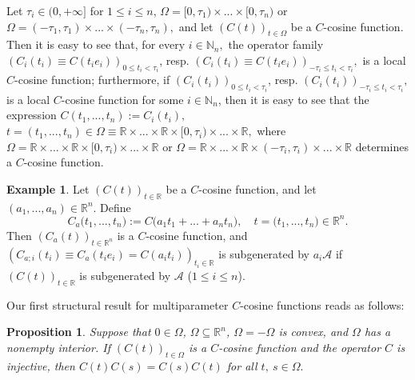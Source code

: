 \documentclass{amsart}
\newtheorem{prop}[thm]{Proposition}
\theoremstyle{definition}
\newtheorem{example}[thm]{Example}
\theoremstyle{remark}
\numberwithin{equation}{section}
\begin{document}
Let $\tau_{i}\in (0,+\infty]$ for $1\leq i \leq n$, $\Omega =[0,\tau_{1}) \times ... \times [0,\tau_{n})$ or $\Omega =(-\tau_{1},\tau_{1}) \times ... \times (-\tau_{n},\tau_{n}),$ and let $(C(t))_{t\in \Omega}$ 
be a $C$-cosine function. Then it is easy to see that, for every $i\in {\mathbb N}_{n},$ the operator family $(C_{i}(t_{i})\equiv C(t_{i}e_{i}))_{0\leq t_{i} <\tau_{i}}$, resp. $(C_{i}(t_{i})\equiv C(t_{i}e_{i}))_{-\tau_{i}\leq t_{i} <\tau_{i}},$  is a local $C$-cosine function; furthermore, if 
$(C_{i}(t_{i}))_{0\leq t_{i} <\tau_{i}}$, resp. $(C_{i}(t_{i}))_{-\tau_{i}\leq t_{i} <\tau_{i}},$ is a local $C$-cosine function for some $i\in {\mathbb N}_{n}$, then it is easy to see that the expression 
$C(t_{1},...,t_{n}):=C_{i}(t_{i}),$ $t=(t_{1},...,t_{n})\in \Omega\equiv {\mathbb R} \times ...\times {\mathbb R} \times [0,\tau_{i}) \times ... \times {\mathbb R},$ where $\Omega = {\mathbb R} \times ...\times {\mathbb R} \times [0,\tau_{i}) \times ... \times {\mathbb R}$ or $\Omega ={\mathbb R} \times ...\times {\mathbb R} \times (-\tau_{i},\tau_{i}) \times ... \times {\mathbb R}$ determines a $C$-cosine function. 

\begin{example}\label{pas}
Let $(C(t))_{t\in {\mathbb R}}$ be a $C$-cosine function, and let $(a_{1},...,a_{n})\in {\mathbb R}^{n}.$ Define
$$
C_{a}\bigl(t_{1},...,t_{n}\bigr):=C\bigl( a_{1}t_{1}+...+a_{n}t_{n}\bigr),\quad t=\bigl(t_{1},...,t_{n}\bigr) \in {\mathbb R}^{n}.
$$
Then $(C_{a}(t))_{t\in {\mathbb R}^{n}}$ is a $C$-cosine function, and $(C_{a;i}(t_{i})\equiv C_{a}(t_{i}e_{i})=C(a_{i}t_{i}))_{t_{i} \in {\mathbb R}}$ is subgenerated by $a_{i}{\mathcal A}$ if $(C(t))_{t \in {\mathbb R}}$  is subgenerated by ${\mathcal A}$ ($1\leq i\leq n$). 
\end{example}

Our first structural result for multiparameter $C$-cosine functions reads as follows:

\begin{prop}\label{rambo}
Suppose that $0\in \Omega$, $\Omega  \subseteq {\mathbb R}^{n}$, $\Omega=-\Omega$  is convex, and $\Omega$ has a nonempty interior. If $(C(t))_{t\in \Omega}$ 
is a $C$-cosine function and the operator $C$ is injective, then $C(t)C(s)=C(s)C(t)$ for all $t,\ s\in \Omega.$
\end{prop}
\end{document}
